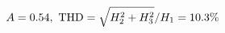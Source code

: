 \documentclass[preview]{standalone}
\begin{document}
\begin{align*}
\special{dvisvgm:raw <g id='unique000'>}A=0.54,\ \text{THD}=\sqrt{H_2^2+H_3^2}/H_1=10.3\%\special{dvisvgm:raw </g>}
\end{align*}
\end{document}
